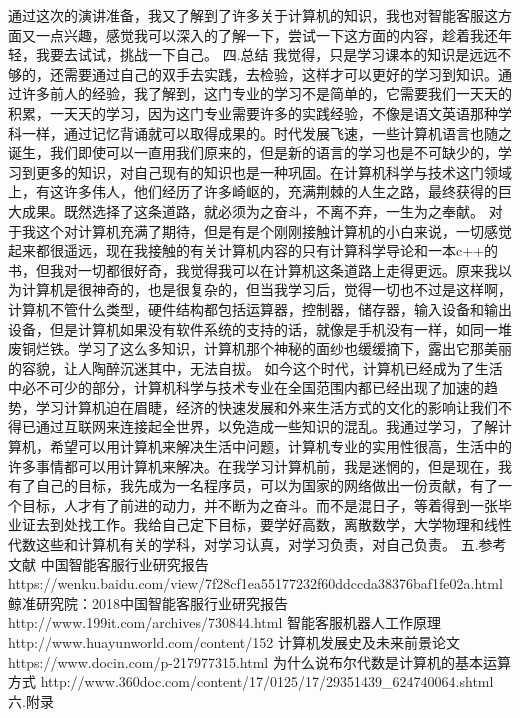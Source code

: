     通过这次的演讲准备，我又了解到了许多关于计算机的知识，我也对智能客服这方面又一点兴趣，感觉我可以深入的了解一下，尝试一下这方面的内容，趁着我还年轻，我要去试试，挑战一下自己。
    四.总结
   我觉得，只是学习课本的知识是远远不够的，还需要通过自己的双手去实践，去检验，这样才可以更好的学习到知识。通过许多前人的经验，我了解到，这门专业的学习不是简单的，它需要我们一天天的积累，一天天的学习，因为这门专业需要许多的实践经验，不像是语文英语那种学科一样，通过记忆背诵就可以取得成果的。时代发展飞速，一些计算机语言也随之诞生，我们即使可以一直用我们原来的，但是新的语言的学习也是不可缺少的，学习到更多的知识，对自己现有的知识也是一种巩固。在计算机科学与技术这门领域上，有这许多伟人，他们经历了许多崎岖的，充满荆棘的人生之路，最终获得的巨大成果。既然选择了这条道路，就必须为之奋斗，不离不弃，一生为之奉献。
   对于我这个对计算机充满了期待，但是有是个刚刚接触计算机的小白来说，一切感觉起来都很遥远，现在我接触的有关计算机内容的只有计算科学导论和一本c++的书，但我对一切都很好奇，我觉得我可以在计算机这条道路上走得更远。原来我以为计算机是很神奇的，也是很复杂的，但当我学习后，觉得一切也不过是这样啊，计算机不管什么类型，硬件结构都包括运算器，控制器，储存器，输入设备和输出设备，但是计算机如果没有软件系统的支持的话，就像是手机没有一样，如同一堆废铜烂铁。学习了这么多知识，计算机那个神秘的面纱也缓缓摘下，露出它那美丽的容貌，让人陶醉沉迷其中，无法自拔。
  如今这个时代，计算机已经成为了生活中必不可少的部分，计算机科学与技术专业在全国范围内都已经出现了加速的趋势，学习计算机迫在眉睫，经济的快速发展和外来生活方式的文化的影响让我们不得已通过互联网来连接起全世界，以免造成一些知识的混乱。我通过学习，了解计算机，希望可以用计算机来解决生活中问题，计算机专业的实用性很高，生活中的许多事情都可以用计算机来解决。在我学习计算机前，我是迷惘的，但是现在，我有了自己的目标，我先成为一名程序员，可以为国家的网络做出一份贡献，有了一个目标，人才有了前进的动力，并不断为之奋斗。而不是混日子，等着得到一张毕业证去到处找工作。我给自己定下目标，要学好高数，离散数学，大学物理和线性代数这些和计算机有关的学科，对学习认真，对学习负责，对自己负责。
  五.参考文献
  中国智能客服行业研究报告
  https://wenku.baidu.com/view/7f28cf1ea55177232f60ddccda38376baf1fe02a.html
  鲸准研究院：2018中国智能客服行业研究报告
  http://www.199it.com/archives/730844.html
  智能客服机器人工作原理 
   http://www.huayunworld.com/content/152
   计算机发展史及未来前景论文
   https://www.docin.com/p-217977315.html
   为什么说布尔代数是计算机的基本运算方式
    http://www.360doc.com/content/17/0125/17/29351439_624740064.shtml
   六.附录
  
